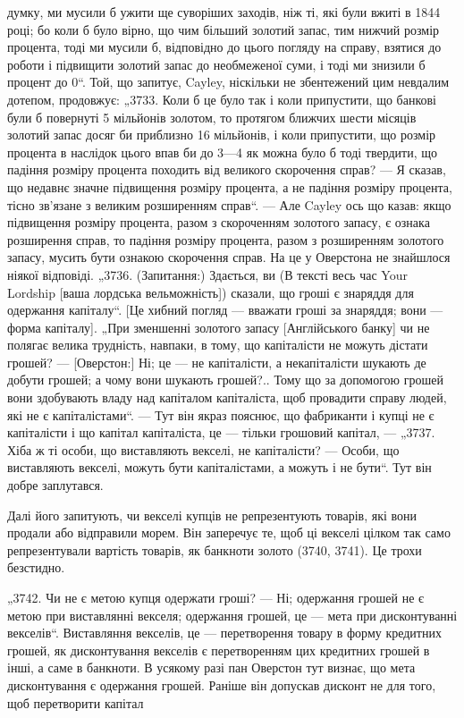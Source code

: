 думку, ми мусили б ужити ще суворіших заходів, ніж ті, які
були вжиті в 1844 році; бо коли б було вірно, що чим більший
золотий запас, тим нижчий розмір процента, тоді ми мусили б,
відповідно до цього погляду на справу, взятися до роботи і підвищити золотий запас до необмеженої
суми, і тоді ми знизили б
процент до 0“. Той, що запитує, Cayley, ніскільки не збентежений цим невдалим дотепом, продовжує:
„3733. Коли б це
було так і коли припустити, що банкові були б повернуті
5 мільйонів золотом, то протягом ближчих шести місяців золотий запас досяг би приблизно 16
мільйонів, і коли припустити,
що розмір процента в наслідок цього впав би до 3—4%
як можна було б тоді твердити, що падіння розміру процента
походить від великого скорочення справ? — Я сказав, що недавнє значне підвищення розміру процента, а
не падіння розміру
процента, тісно зв’язане з великим розширенням справ“. — Але
Cayley ось що казав: якщо підвищення розміру процента, разом з скороченням золотого запасу, є ознака
розширення справ,
то падіння розміру процента, разом з розширенням золотого
запасу, мусить бути ознакою скорочення справ. На це у
Оверстона не знайшлося ніякої відповіді. „3736. (Запитання:)
Здається, ви (В тексті весь час Your Lordship [ваша лордська
вельможність]) сказали, що гроші є знаряддя для одержання
капіталу“. [Це хибний погляд — вважати гроші за знаряддя; вони — форма капіталу]. „При зменшенні
золотого запасу [Англійського банку] чи не полягає велика трудність, навпаки, в тому,
що капіталісти не можуть дістати грошей? — [Оверстон:]
Ні; це — не капіталісти, а некапіталісти шукають де добути
грошей; а чому вони шукають грошей?.. Тому що за допомогою
грошей вони здобувають владу над капіталом капіталіста, щоб
провадити справу людей, які не є капіталістами“. — Тут він
якраз пояснює, що фабриканти і купці не є капіталісти і що
капітал капіталіста, це — тільки грошовий капітал, — „3737. Хіба ж
ті особи, що виставляють векселі, не капіталісти? — Особи,
що виставляють векселі, можуть бути капіталістами, а можуть
і не бути“. Тут він добре заплутався.

Далі його запитують, чи векселі купців не репрезентують
товарів, які вони продали або відправили морем. Він заперечує те, щоб ці векселі цілком так само
репрезентували
вартість товарів, як банкноти золото (3740, 3741). Це трохи
безстидно.

„3742. Чи не є метою купця одержати гроші? — Ні; одержання грошей не є метою при виставлянні
векселя; одержання
грошей, це — мета при дисконтуванні векселів“. Виставляння
векселів, це — перетворення товару в форму кредитних грошей,
як дисконтування векселів є перетворенням цих кредитних грошей в інші, а саме в банкноти. В усякому
разі пан Оверстон тут
визнає, що мета дисконтування є одержання грошей. Раніше
він допускав дисконт не для того, щоб перетворити капітал
